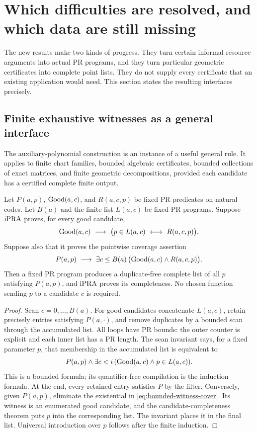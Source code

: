 \section{Which difficulties are resolved, and which data are still missing}
\label{sec:applications}

The new results make two kinds of progress. They turn certain informal
resource arguments into actual PR programs, and they turn particular
geometric certificates into complete point lists. They do not supply
every certificate that an existing application would need. This section
states the resulting interfaces precisely.

\subsection{Finite exhaustive witnesses as a general interface}

The auxiliary-polynomial construction is an instance of a useful
general rule. It applies to finite chart families, bounded algebraic
certificates, bounded collections of exact matrices, and finite
geometric decompositions, provided each candidate has a certified
complete finite output.

\begin{theorem}
\label{thm:exhaustive}
Let \(P(a,p)\), \(\operatorname{Good}(a,c)\), and \(R(a,c,p)\) be fixed PR
predicates on natural codes. Let \(B(a)\) and the finite list
\(L(a,c)\) be fixed PR programs. Suppose \(\mathrm{iPRA}\) proves, for every
good candidate,
\[
 \operatorname{Good}(a,c)\ \longrightarrow\
 \bigl(p\in L(a,c)\ \longleftrightarrow\ R(a,c,p)\bigr).
\]
Suppose also that it proves the pointwise coverage assertion
\begin{equation}\label{eq:bounded-witness-cover}
 P(a,p)\ \longrightarrow\
 \exists c\le B(a)\,
       \bigl(\operatorname{Good}(a,c)\wedge R(a,c,p)\bigr).
\end{equation}
Then a fixed PR program produces a duplicate-free complete list of
all \(p\) satisfying \(P(a,p)\), and \(\mathrm{iPRA}\) proves its completeness.
No chosen function sending \(p\) to a candidate \(c\) is required.
\end{theorem}

\begin{proof}
Scan \(c=0,\ldots,B(a)\). For good candidates concatenate \(L(a,c)\),
retain precisely entries satisfying \(P(a,\cdot)\), and remove
duplicates by a bounded scan through the accumulated list.
All loops have PR bounds: the outer counter is explicit and each
inner list has a PR length. The scan invariant says, for a fixed
parameter \(p\), that membership in the accumulated list is
equivalent to
\[
 P(a,p)\wedge\exists c<i\,
       (\operatorname{Good}(a,c)\wedge p\in L(a,c)).
\]
This is a bounded formula; its quantifier-free compilation is the
induction formula. At the end, every retained entry satisfies \(P\)
by the filter. Conversely, given \(P(a,p)\), eliminate the existential
in \eqref{eq:bounded-witness-cover}. Its witness is an enumerated good
candidate, and the candidate-completeness theorem puts \(p\) into
the corresponding list. The invariant places it in the final list.
Universal introduction over \(p\) follows after the finite induction.
\end{proof}

